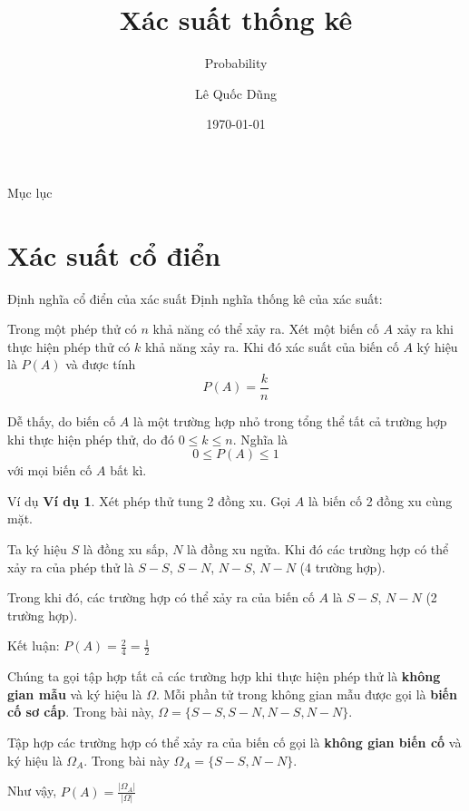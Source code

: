 \documentclass[aspectratio=169,xcolor=dvipsnames,serif]{beamer}
\title[short title]{Xác suất thống kê} %
\subtitle{Probability}
\author{Lê Quốc Dũng}
\institute[MPEI] %
{
    Moscow Power Engineering Institute %
}
\date{\today} %
\begin{document}
\begin{frame}
    \titlepage
\end{frame}

\begin{frame}{Mục lục}
    \tableofcontents
\end{frame}

\section{Xác suất cổ điển}

\begin{frame}{Định nghĩa cổ điển của xác suất}
    Định nghĩa thống kê của xác suất:
    
    Trong một phép thử có $n$ khả năng có thể xảy ra. Xét một biến cố $A$ xảy ra khi thực hiện phép thử có $k$ khả năng xảy ra. Khi đó xác suất của biến cố $A$ ký hiệu là $P(A)$ và được tính \[P(A) = \frac{k}{n}\]
    
    Dễ thấy, do biến cố $A$ là một trường hợp nhỏ trong tổng thể tất cả trường hợp khi thực hiện phép thử, do đó $0 \leq k \leq n$. Nghĩa là \[0 \leq P(A) \leq 1\] với mọi biến cố $A$ bất kì.
\end{frame}

\begin{frame}{Ví dụ}
    \textbf{Ví dụ 1}. Xét phép thử tung 2 đồng xu. Gọi $A$ là biến cố 2 đồng xu cùng mặt.
    
    Ta ký hiệu $S$ là đồng xu sấp, $N$ là đồng xu ngửa. Khi đó các trường hợp có thể xảy ra của phép thử là $S-S$, $S-N$, $N-S$, $N-N$ (4 trường hợp). 
    
    Trong khi đó, các trường hợp có thể xảy ra của biến cố $A$ là $S-S$, $N-N$ (2 trường hợp).
    
    Kết luận: $P(A) = \frac{2}{4} = \frac{1}{2}$
    
    Chúng ta gọi tập hợp tất cả các trường hợp khi thực hiện phép thử là \textbf{không gian mẫu} và ký hiệu là $\Omega$. Mỗi phần tử trong không gian mẫu được gọi là \textbf{biến cố sơ cấp}. Trong bài này, $\Omega = \{S-S, S-N, N-S, N-N\}$.
    
    Tập hợp các trường hợp có thể xảy ra của biến cố gọi là \textbf{không gian biến cố} và ký hiệu là $\Omega_A$. Trong bài này $\Omega_A = \{S-S, N-N\}$.
    
    Như vậy, $P(A) = \frac{|\Omega_A|}{|\Omega|}$
\end{frame}
\end{document}

